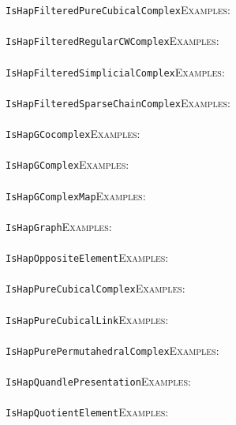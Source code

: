 \documentclass[a4paper,11pt]{report}
\begin{document}
{{ \texttt{IsHapFilteredPureCubicalComplex}{\nobreakspace}{\nobreakspace}{\nobreakspace}{\nobreakspace}\textsc{Examples:} \\
 \\
 \texttt{IsHapFilteredRegularCWComplex}{\nobreakspace}{\nobreakspace}{\nobreakspace}{\nobreakspace}\textsc{Examples:} \\
 \\
 \texttt{IsHapFilteredSimplicialComplex}{\nobreakspace}{\nobreakspace}{\nobreakspace}{\nobreakspace}\textsc{Examples:} \\
 \\
 \texttt{IsHapFilteredSparseChainComplex}{\nobreakspace}{\nobreakspace}{\nobreakspace}{\nobreakspace}\textsc{Examples:} \\
 \\
 \texttt{IsHapGCocomplex}{\nobreakspace}{\nobreakspace}{\nobreakspace}{\nobreakspace}\textsc{Examples:} \\
 \\
 \texttt{IsHapGComplex}{\nobreakspace}{\nobreakspace}{\nobreakspace}{\nobreakspace}\textsc{Examples:} \\
 \\
 \texttt{IsHapGComplexMap}{\nobreakspace}{\nobreakspace}{\nobreakspace}{\nobreakspace}\textsc{Examples:} \\
 \\
 \texttt{IsHapGraph}{\nobreakspace}{\nobreakspace}{\nobreakspace}{\nobreakspace}\textsc{Examples:} \\
 \\
 \texttt{IsHapOppositeElement}{\nobreakspace}{\nobreakspace}{\nobreakspace}{\nobreakspace}\textsc{Examples:} \\
 \\
 \texttt{IsHapPureCubicalComplex}{\nobreakspace}{\nobreakspace}{\nobreakspace}{\nobreakspace}\textsc{Examples:} \\
 \\
 \texttt{IsHapPureCubicalLink}{\nobreakspace}{\nobreakspace}{\nobreakspace}{\nobreakspace}\textsc{Examples:} \\
 \\
 \texttt{IsHapPurePermutahedralComplex}{\nobreakspace}{\nobreakspace}{\nobreakspace}{\nobreakspace}\textsc{Examples:} \\
 \\
 \texttt{IsHapQuandlePresentation}{\nobreakspace}{\nobreakspace}{\nobreakspace}{\nobreakspace}\textsc{Examples:} \\
 \\
 \texttt{IsHapQuotientElement}{\nobreakspace}{\nobreakspace}{\nobreakspace}{\nobreakspace}\textsc{Examples:} \\
}}
\end{document}

